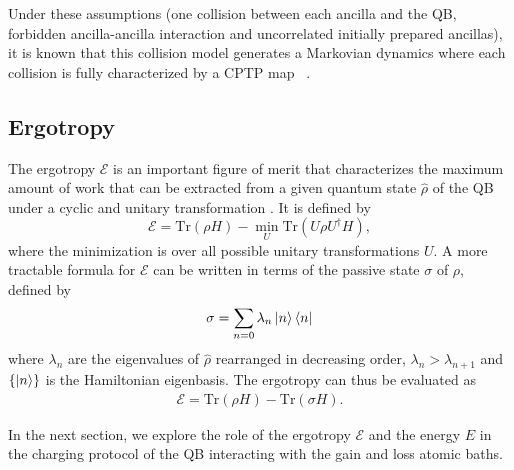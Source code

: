 \documentclass[%
reprint,
superscriptaddress,
amsmath,amssymb,
aps,
pra,
]{revtex4-2}
\begin{document}
Under these assumptions (one collision between each ancilla and the QB, forbidden ancilla-ancilla interaction and uncorrelated initially prepared ancillas), it is known that this collision model generates a Markovian dynamics where each collision is fully characterized by a CPTP map ~\cite{ciccarello2022quantum}. 



\subsection{Ergotropy}

The ergotropy $\mathcal{E}$ is an important figure of merit that characterizes the maximum amount of work that can be extracted from a given quantum state $\hat{\rho}$ of the QB under a cyclic and unitary transformation \cite{allahverdyan2004maximal}. It is defined by $$\mathcal{E} = \text{Tr}(\rho H) - \underset{U}{\min} \text{Tr}(U \rho U^{\dagger} H),$$ where the minimization is over all possible unitary transformations $U$. A more tractable formula for $\mathcal{E}$ can be written in terms of the passive state $\sigma$ of $\rho$, defined by
\begin{align}
    \sigma = \sum_{n = 0}\lambda_n\ket{n}\bra{n}
\end{align}
where $\lambda_n$ are the eigenvalues of $\hat{\rho}$ rearranged in decreasing order, $\lambda_n > \lambda_{n+1}$ and $\{ \ket{n} \}$ is the Hamiltonian eigenbasis. The ergotropy can thus be evaluated as
\begin{align}\label{ergotropy}
    \mathcal{E} = \text{Tr}(\rho H) - \text{Tr}( \sigma H).
\end{align}

In the next section, we explore the role of the ergotropy $\mathcal{E}$ and the energy $E$ in the charging protocol of the QB interacting with the gain and loss atomic baths. 
\end{document}
